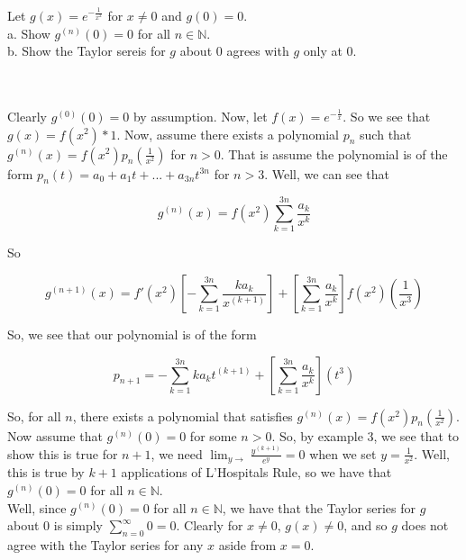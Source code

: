Let $g(x)=e^{-\frac{1}{x^2}}$ for $x\neq0$ and $g(0)=0$.\\

a. Show $g^{(n)}(0)=0$ for all $n\in\mathbb{N}$.\\

b. Show the Taylor sereis for $g$ about $0$ agrees with $g$ only at $0$.\\\\

\begin{solution}\renewcommand{\qedsymbol}{}\ \\
    Clearly $g^{(0)}(0)=0$ by assumption. Now, let $f(x)=e^{-\frac{1}{x}}$. So we see that
    $g(x)=f(x^2)*1$. Now, assume there exists a polynomial $p_n$ such that
    $g^{(n)}(x)=f(x^2)p_n(\frac{1}{x^2})$ for $n>0$. That is assume the polynomial is of the form
    $p_n(t)=a_0+a_1t+...+a_{3n}t^{3n}$ for $n>3$. Well, we can see that
    
    $$g^{(n)}(x)=f(x^2)\sum_{k=1}^{3n}\frac{a_k}{x^k}$$
    
    So
    
    $$g^{(n+1)}(x)=f'(x^2)[-\sum_{k=1}^{3n}\frac{ka_k}{x^(k+1)}]
    +[\sum_{k=1}^{3n}\frac{a_k}{x^k}]f(x^2)(\frac{1}{x^3})$$
    
    So, we see that our polynomial is of the form
    
    $$p_{n+1}= -\sum_{k=1}^{3n}ka_kt^{(k+1)}+[\sum_{k=1}^{3n}\frac{a_k}{x^k}](t^3)$$
    
    So, for all $n$, there exists a polynomial that satisfies $g^{(n)}(x)=f(x^2)p_n(\frac{1}{x^2})$. Now
    assume that $g^{(n)}(0)=0$ for some $n>0$. So, by example 3, we see that to show this is true for
    $n+1$, we need $\lim_{y\rightarrow}\frac{y^{(k+1)}}{e^y}=0$ when we set $y=\frac{1}{x^2}$. Well,
    this is true by $k+1$ applications of L'Hospitals Rule, so we have that $g^{(n)}(0)=0$ for all
    $n\in\mathbb{N}$.\\

    Well, since $g^{(n)}(0)=0$ for all $n\in\mathbb{N}$, we have that the Taylor series for $g$ about
    $0$ is simply $\sum_{n=0}^{\infty}0=0$. Clearly for $x\neq0$, $g(x)\neq0$, and so $g$ does not
    agree with the Taylor series for any $x$ aside from $x=0$.

\end{solution}
